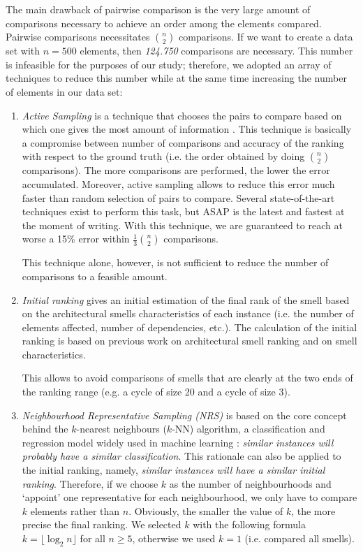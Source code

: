 The main drawback of pairwise comparison is the very large amount of comparisons necessary to achieve an order among the elements compared.
Pairwise comparisons necessitates $\binom{n}{2}$ comparisons. If we want to create a data set with $n = 500$ elements, then \emph{124.750} comparisons are necessary.
This number is infeasible for the purposes of our study; therefore, we adopted an array of techniques to reduce this number while at the same time increasing the number of elements in our data set:
\begin{enumerate}
    
    \item \emph{Active Sampling} is a technique that chooses the pairs to compare based on which one gives the most amount of information \cite{Mikhailiuk2020}. This technique is basically a compromise between number of comparisons and accuracy of the ranking with respect to the ground truth (i.e. the order obtained by doing $\binom{n}{2}$ comparisons). 
    The more comparisons are performed, the lower the error accumulated.
    Moreover, active sampling allows to reduce this error much faster than random selection of pairs to compare. 
    Several state-of-the-art techniques exist to perform this task, but ASAP \cite{Mikhailiuk2020} is the latest and fastest at the moment of writing.
    With this technique, we are guaranteed to reach at worse a 15\% error within $\frac{1}{3}\binom{n}{2}$ comparisons.
    
    This technique alone, however, is not sufficient to reduce the number of comparisons to a feasible amount.

    \item \emph{Initial ranking} gives an initial estimation of the final rank of the smell based on the architectural smells characteristics of each instance (i.e. the number of elements affected, number of dependencies, etc.). 
    The calculation of the initial ranking is based on previous work on architectural smell ranking \cite{Laval2012} and on smell characteristics.
    
    This allows to avoid comparisons of smells that are clearly at the two ends of the ranking range (e.g. a cycle of size 20 and a cycle of size 3).

    \item \emph{Neighbourhood Representative Sampling (NRS)} is based on the core concept behind the $k$-nearest neighbours ($k$-NN) algorithm, a classification and regression model widely used in machine learning \cite{Fix1989}: \emph{similar instances will probably have a similar classification}.
    This rationale can also be applied to the initial ranking, namely, \emph{similar instances will have a similar initial ranking}.
    Therefore, if we choose $k$ as the number of neighbourhoods and `appoint' one representative for each neighbourhood, we only have to compare $k$ elements rather than $n$.
    Obviously, the smaller the value of $k$, the more precise the final ranking.
    We selected $k$ with the following formula $k = \lfloor\log_2 n\rfloor$ for all $n \ge 5$, otherwise we used $k = 1$ (i.e. compared all smells).


\end{enumerate}
